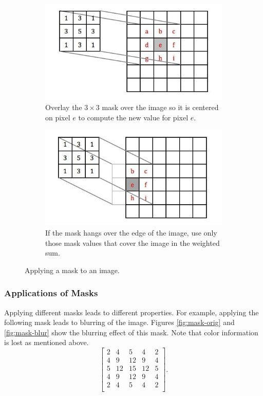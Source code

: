 \documentclass[addpoints]{exam}
\begin{document}
\begin{figure}
  \centering
  \begin{subfigure}{.48\textwidth}
    \includegraphics[width=\textwidth]{mask1}
    \caption{Overlay the $3 \times 3$ mask over the image so it is centered on pixel $e$ to compute the new value for pixel $e$.}\label{fig:mask-full}
  \end{subfigure}
  \begin{subfigure}[c]{.48\textwidth}
    \includegraphics[width=\textwidth]{mask2}
    \caption{If the mask hangs over the edge of the image, use only those mask values that cover the image in the weighted sum.}\label{fig:mask-hang}
  \end{subfigure}
  \caption{Applying a mask to an image.}
  \label{fig:mask}
\end{figure}

\subsubsection{Applications of Masks}

Applying different masks leads to different properties. For example, applying the following mask leads to blurring of the image. Figures \ref{fig:mask-orig} and \ref{fig:mask-blur} show the blurring effect of this mask. Note that color information is lost as mentioned above.
\[
  \left[
    \begin{array}{ccccc}
      2 & 4 & 5 & 4 & 2\\
      4 & 9 & 12 & 9 & 4\\
      5 & 12 & 15 & 12 & 5\\
      4 & 9 & 12 & 9 & 4\\
      2 & 4 & 5 & 4 & 2\\
    \end{array}          
  \right].
\]
\end{document}
